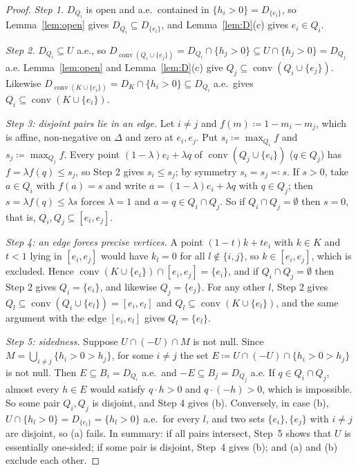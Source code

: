 \documentclass[11pt]{article}
\DeclareMathOperator{\conv}{conv}
\theoremstyle{plain}
\theoremstyle{definition}
\theoremstyle{remark}
\begin{document}
\begin{proof}
\emph{Step 1.} $D_{Q_i}$ is open and a.e.\ contained in $\{h_i>0\}=D_{\{e_i\}}$, so
Lemma~\ref{lem:open} gives $D_{Q_i}\subseteq D_{\{e_i\}}$, and Lemma~\ref{lem:D}(c) gives
$e_i\in Q_i$.

\emph{Step 2.} $D_{Q_i}\subseteq U$ a.e., so $D_{\conv(Q_i\cup\{e_j\})}=D_{Q_i}\cap\{h_j>0\}
\subseteq U\cap\{h_j>0\}=D_{Q_j}$ a.e. Lemma~\ref{lem:open} and Lemma~\ref{lem:D}(c) give
$Q_j\subseteq\conv(Q_i\cup\{e_j\})$. Likewise $D_{\conv(K\cup\{e_i\})}=D_K\cap\{h_i>0\}
\subseteq D_{Q_i}$ a.e.\ gives $Q_i\subseteq\conv(K\cup\{e_i\})$.

\emph{Step 3: disjoint pairs lie in an edge.} Let $i\ne j$ and $f(m)\coloneqq1-m_i-m_j$,
which is affine, non-negative on $\Delta$ and zero at $e_i,e_j$. Put $s_i\coloneqq
\max_{Q_i}f$ and $s_j\coloneqq\max_{Q_j}f$. Every point $(1-\lambda)e_i+\lambda q$ of
$\conv(Q_j\cup\{e_i\})$ ($q\in Q_j$) has $f=\lambda f(q)\le s_j$, so Step 2 gives $s_i\le
s_j$; by symmetry $s_i=s_j\eqqcolon s$. If $s>0$, take $a\in Q_i$ with $f(a)=s$ and write
$a=(1-\lambda)e_i+\lambda q$ with $q\in Q_j$; then $s=\lambda f(q)\le\lambda s$ forces
$\lambda=1$ and $a=q\in Q_i\cap Q_j$. So if $Q_i\cap Q_j=\emptyset$ then $s=0$, that is,
$Q_i,Q_j\subseteq[e_i,e_j]$.

\emph{Step 4: an edge forces precise vertices.} A point $(1-t)k+te_i$ with $k\in K$ and
$t<1$ lying in $[e_i,e_j]$ would have $k_l=0$ for all $l\notin\{i,j\}$, so $k\in[e_i,e_j]$,
which is excluded. Hence $\conv(K\cup\{e_i\})\cap[e_i,e_j]=\{e_i\}$, and if $Q_i\cap Q_j=
\emptyset$ then Step 2 gives $Q_i=\{e_i\}$, and likewise $Q_j=\{e_j\}$. For any other $l$,
Step 2 gives $Q_l\subseteq\conv(Q_i\cup\{e_l\})=[e_i,e_l]$ and $Q_l\subseteq\conv(K\cup
\{e_l\})$, and the same argument with the edge $[e_i,e_l]$ gives $Q_l=\{e_l\}$.

\emph{Step 5: sidedness.} Suppose $U\cap(-U)\cap M$ is not null. Since $M=\bigcup_{i\neq
j}\{h_i>0>h_j\}$, for some $i\ne j$ the set $E\coloneqq U\cap(-U)\cap\{h_i>0>h_j\}$ is not
null. Then $E\subseteq B_i=D_{Q_i}$ a.e.\ and $-E\subseteq B_j=D_{Q_j}$ a.e. If
$q\in Q_i\cap Q_j$, almost every $h\in E$ would satisfy $q\cdot h>0$ and $q\cdot(-h)>0$,
which is impossible. So some pair $Q_i,Q_j$ is disjoint, and Step 4 gives (b). Conversely,
in case (b), $U\cap\{h_l>0\}=D_{\{e_l\}}=\{h_l>0\}$ a.e.\ for every $l$, and two sets
$\{e_i\},\{e_j\}$ with $i\ne j$ are disjoint, so (a) fails. In summary: if all pairs
intersect, Step~5 shows that $U$ is essentially one-sided; if some pair is disjoint,
Step~4 gives (b); and (a) and (b) exclude each other.
\end{proof}
\end{document}
